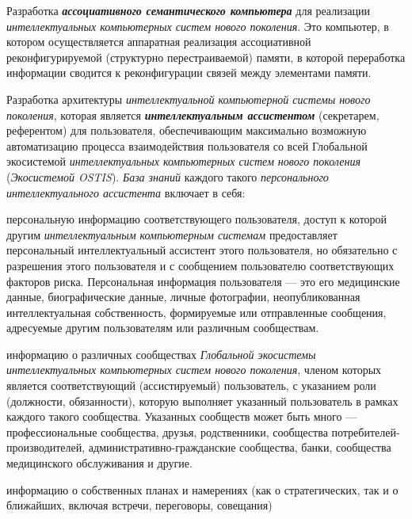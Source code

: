 \begin{textitemize}
	\item 
	Разработка \textbf{\textit{ассоциативного семантического компьютера}} для реализации \textit{интеллектуальных компьютерных систем нового поколения}. Это  компьютер, в котором осуществляется аппаратная реализация ассоциативной реконфигурируемой (структурно перестраиваемой) памяти, в которой переработка информации сводится к реконфигурации связей между элементами памяти.
	
	\item Разработка архитектуры \textit{интеллектуальной компьютерной системы нового поколения}, которая является \textbf{\textit{ интеллектуальным ассистентом}} (секретарем, референтом) для  пользователя, обеспечивающим максимально возможную автоматизацию процесса взаимодействия пользователя со всей Глобальной экосистемой \textit{интеллектуальных компьютерных систем нового поколения} (\textit{Экосистемой OSTIS}). \textit{База знаний} каждого такого \textit{персонального интеллектуального ассистента} включает в себя:
	\begin{textitemize}
		\item персональную информацию соответствующего пользователя, доступ к которой другим \textit{интеллектуальным компьютерным системам} предоставляет персональный интеллектуальный ассистент этого пользователя, но обязательно с разрешения этого пользователя и с сообщением пользователю соответствующих факторов риска. Персональная информация пользователя --- это его медицинские данные, биографические данные, личные фотографии, неопубликованная интеллектуальная собственность, формируемые или отправленные сообщения, адресуемые другим пользователям или различным сообществам.
		\item информацию о различных сообществах \textit{Глобальной экосистемы интеллектуальных компьютерных систем нового поколения}, членом которых является соответствующий (ассистируемый) пользователь, с указанием роли (должности, обязанности), которую выполняет указанный пользователь в рамках каждого такого сообщества. Указанных сообществ может быть много --- профессиональные сообщества, друзья, родственники, сообщества потребителей-производителей, административно-гражданские сообщества, банки, сообщества медицинского обслуживания и другие.
		\item информацию о собственных планах и намерениях (как о стратегических, так и о ближайших, включая встречи, переговоры, совещания)
	\end{textitemize}
	\item

\end{textitemize}
